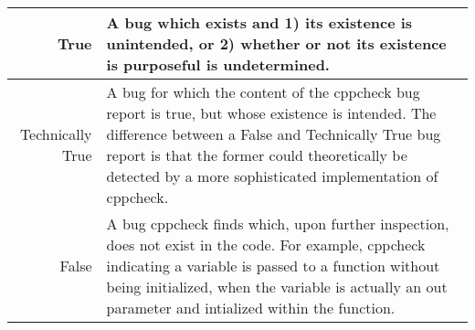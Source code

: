 \begin{center}
  \noindent\begin{tabularx}{0.75\textwidth}{rX}
    \toprule
    True & A bug which exists and 1) its existence is unintended, or 2) whether or not its existence is purposeful is undetermined. \\
    \midrule
    Technically True & A bug for which the content of the cppcheck bug report is true, but whose existence is intended. The difference between a False and Technically True bug report is that the former could theoretically be detected by a more sophisticated implementation of cppcheck. \\
    \midrule
    False & A bug cppcheck finds which, upon further inspection, does not exist in the code. For example, cppcheck indicating a variable is passed to a function without being initialized, when the variable is actually an out parameter and intialized within the function.\\
    \bottomrule
  \end{tabularx}
\end{center}
